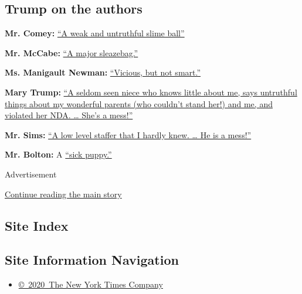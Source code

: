 \hypertarget{trump-on-the-authors}{%
\subsection{Trump on the authors}\label{trump-on-the-authors}}

\textbf{Mr. Comey:}
\href{https://www.businessinsider.com/trump-tweets-james-comey-book-higher-loyalty-slime-ball-2018-4}{``A
weak and untruthful slime ball''}

\textbf{Mr. McCabe:}
\href{https://twitter.com/realdonaldtrump/status/1150011125347627009?lang=en}{``A
major sleazebag.''}

\textbf{Ms. Manigault Newman:}
\href{https://www.cnbc.com/2018/08/13/trump-launches-twitter-attack-on-omarosa-she-was-vicious-but-not-smart.html}{``Vicious,
but not smart.''}

\textbf{Mary Trump:}
\href{https://twitter.com/realdonaldtrump/status/1284255473424891905}{``A
seldom seen niece who knows little about me, says untruthful things
about my wonderful parents (who couldn't stand her!) and me, and
violated her NDA. \ldots{} She's a mess!''}

\textbf{Mr. Sims:}
\href{https://twitter.com/realdonaldtrump/status/1090244651578204160?lang=en}{``A
low level staffer that I hardly knew. \ldots{} He is a mess!''}

\textbf{Mr. Bolton:} A
\href{https://twitter.com/realdonaldtrump/status/1273603410340843520}{``sick
puppy.''}

Advertisement

\protect\hyperlink{after-bottom}{Continue reading the main story}

\hypertarget{site-index}{%
\subsection{Site Index}\label{site-index}}

\hypertarget{site-information-navigation}{%
\subsection{Site Information
Navigation}\label{site-information-navigation}}

\begin{itemize}
\tightlist
\item
  \href{https://help.nytimes3xbfgragh.onion/hc/en-us/articles/115014792127-Copyright-notice}{©~2020~The
  New York Times Company}
\end{itemize}

